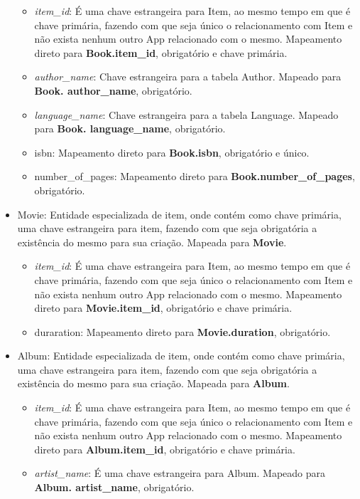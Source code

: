 \documentclass[a4paper, 11pt]{article}
\begin{document}
\begin{itemize}
    \begin{itemize}
        \item {\textit{item\_id}}: É uma chave estrangeira para Item, ao mesmo tempo em que é chave primária, fazendo com que seja único o relacionamento com Item e não exista nenhum outro App relacionado com o mesmo. Mapeamento direto para {\textbf{Book.item\_id}}, obrigatório e chave primária.
        \item {\textit{author\_name}}: Chave estrangeira para a tabela Author. Mapeado para {\textbf{Book. author\_name}}, obrigatório.
        \item {\textit{language\_name}}: Chave estrangeira para a tabela Language. Mapeado para {\textbf{Book. language\_name}}, obrigatório.
        \item isbn: Mapeamento direto para {\textbf{Book.isbn}}, obrigatório e único.
        \item number\_of\_pages: Mapeamento direto para {\textbf{Book.number\_of\_pages}}, obrigatório.
    \end{itemize}
    \item Movie: Entidade especializada de item, onde contém como chave primária, uma chave estrangeira para item, fazendo com que seja obrigatória a existência do mesmo para sua criação. Mapeada para {\textbf{Movie}}.
    \begin{itemize}
        \item {\textit{item\_id}}: É uma chave estrangeira para Item, ao mesmo tempo em que é chave primária, fazendo com que seja único o relacionamento com Item e não exista nenhum outro App relacionado com o mesmo. Mapeamento direto para {\textbf{Movie.item\_id}}, obrigatório e chave primária.
        \item duraration: Mapeamento direto para {\textbf{Movie.duration}}, obrigatório.
    \end{itemize}
    \item Album: Entidade especializada de item, onde contém como chave primária, uma chave estrangeira para item, fazendo com que seja obrigatória a existência do mesmo para sua criação. Mapeada para {\textbf{Album}}.
    \begin{itemize}
        \item {\textit{item\_id}}: É uma chave estrangeira para Item, ao mesmo tempo em que é chave primária, fazendo com que seja único o relacionamento com Item e não exista nenhum outro App relacionado com o mesmo. Mapeamento direto para {\textbf{Album.item\_id}}, obrigatório e chave primária.
        \item {\textit{artist\_name}}: É uma chave estrangeira para Album. Mapeado para {\textbf{Album. artist\_name}}, obrigatório.

\end{itemize}
\end{itemize}
\end{document}
